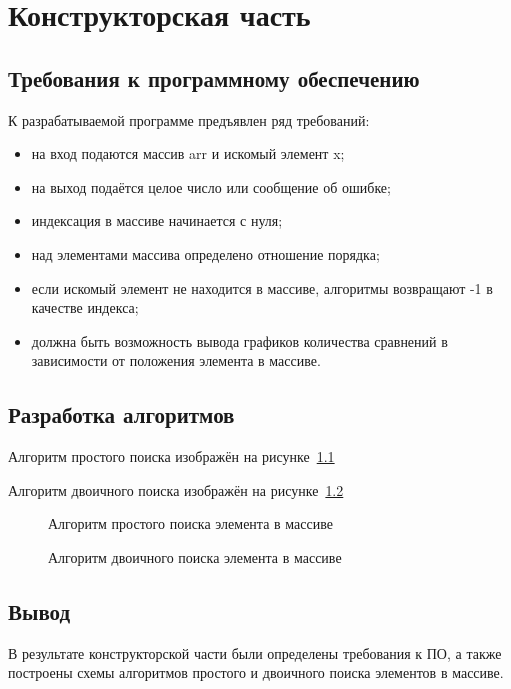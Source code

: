 \chapter{Конструкторская часть}

\section{Требования к программному обеспечению}

К разрабатываемой программе предъявлен ряд требований:

\begin{itemize}
	\item на вход подаются массив arr и искомый элемент x;
	\item на выход подаётся целое число или сообщение об ошибке;
	\item индексация в массиве начинается с нуля;
	\item над элементами массива определено отношение порядка;
	\item если искомый элемент не находится в массиве, алгоритмы возвращают -1 в качестве индекса;
	\item должна быть возможность вывода графиков количества сравнений в зависимости от положения элемента в массиве.
\end{itemize}

\section{Разработка алгоритмов}

Алгоритм простого поиска изображён на рисунке~\ref{fig:alg_simple}

Алгоритм двоичного поиска изображён на рисунке~\ref{fig:alg_bin}

\clearpage

\begin{figure}[h!]
	\centering
	
	\caption{Алгоритм простого поиска элемента в массиве}
	\label{fig:alg_simple}
\end{figure}

\begin{figure}[h!]
	\centering
	
	\caption{Алгоритм двоичного поиска элемента в массиве}
	\label{fig:alg_bin}
\end{figure} 

\section{Вывод}

В результате конструкторской части были определены требования к ПО, а также построены схемы алгоритмов простого и двоичного поиска элементов в массиве.

\clearpage